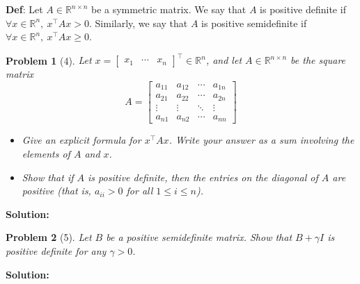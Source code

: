 \documentclass[11pt]{article}
\theoremstyle{quest}
\newtheorem*{question}{Problem}
\begin{document}

\noindent
\textbf{Def}: Let $A \in \mathbb{R}^{n \times n}$ be a symmetric matrix. We say that $A$ is positive definite if $\forall x\in \mathbb{R}^n,\ x^\top Ax > 0$. Similarly, we say that $A$ is positive semidefinite if $\forall x \in \mathbb{R}^n,\ x^\top Ax \geq 0$.
\begin{question}[4]
Let $x = \begin{bmatrix}x_1 & \cdots & x_n\end{bmatrix}^\top \in \mathbb{R}^n$, and let $A \in \mathbb{R}^{n \times n}$ be the square matrix
\begin{equation*}
A = \begin{bmatrix}
  a_{11} & a_{12} & \cdots & a_{1n} \\
  a_{21} & a_{22} & \cdots & a_{2n} \\
  \vdots  & \vdots  & \ddots & \vdots  \\
  a_{n1} & a_{n2} & \cdots & a_{nn}
\end{bmatrix}
\end{equation*}

\begin{itemize}
\item[(a)] Give an explicit formula for $x^\top A x$. Write your answer as a sum involving the elements of $A$ and $x$. 
\item[(b)] Show that if $A$ is positive definite, then the entries on the diagonal of $A$ are positive (that is, $a_{ii} > 0$ for all $1 \leq i \leq n$).
\end{itemize}
\end{question}
\textbf{Solution:}



\newpage
\begin{question}[5]
Let $B$ be a positive semidefinite matrix. Show that $B + \gamma I$ is positive definite for any $\gamma > 0$.
\end{question}
\textbf{Solution:}
\newpage

\end{document}
